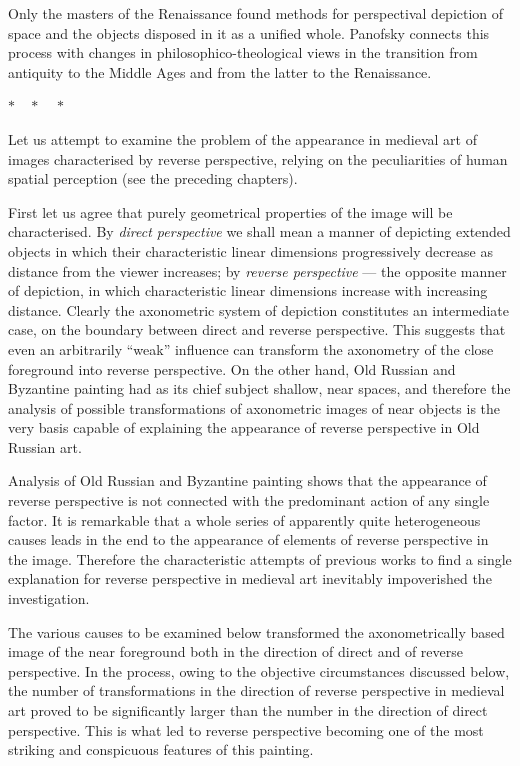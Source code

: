 
Only the masters of the Renaissance found methods for perspectival depiction of space
and the objects disposed in it as a unified whole.  Panofsky connects this process
with changes in philosophico-theological views in the transition from antiquity to the
Middle Ages and from the latter to the Renaissance.

\medskip
\noindent
$* \quad * \quad *$
\medskip

Let us attempt to examine the problem of the appearance in medieval art of images
characterised by reverse perspective, relying on the peculiarities of human spatial
perception (see the preceding chapters).

First let us agree that purely geometrical properties of the image will be
characterised.  By \emph{direct perspective} we shall mean a manner of depicting
extended objects in which their characteristic linear dimensions progressively
decrease as distance from the viewer increases; by \emph{reverse perspective} --- the
opposite manner of depiction, in which characteristic linear dimensions increase with
increasing distance.  Clearly the axonometric system of depiction constitutes an
intermediate case, on the boundary between direct and reverse perspective.  This
suggests that even an arbitrarily ``weak'' influence can transform the axonometry of
the close foreground into reverse perspective.  On the other hand, Old Russian and
Byzantine painting had as its chief subject shallow, near spaces, and therefore the
analysis of possible transformations of axonometric images of near objects is the
very basis capable of explaining the appearance of reverse perspective in Old Russian
art.

Analysis of Old Russian and Byzantine painting shows that the appearance of reverse
perspective is not connected with the predominant action of any single factor.  It is
remarkable that a whole series of apparently quite heterogeneous causes leads in the
end to the appearance of elements of reverse perspective in the image.  Therefore the
characteristic attempts of previous works to find a single explanation for reverse
perspective in medieval art inevitably impoverished the investigation.


The various causes to be examined below transformed the axonometrically based image
of the near foreground both in the direction of direct and of reverse perspective.  In
the process, owing to the objective circumstances discussed below, the number of
transformations in the direction of reverse perspective in medieval art proved to be
significantly larger than the number in the direction of direct perspective.  This is
what led to reverse perspective becoming one of the most striking and conspicuous
features of this painting.

